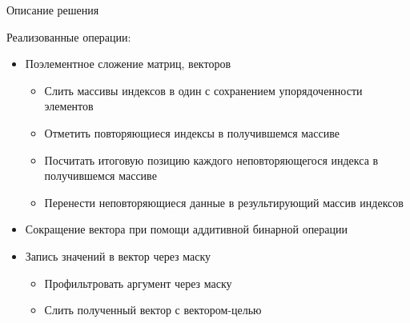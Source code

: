 \documentclass{beamer}
\begin{document}
\begin{frame}{Описание решения}

Реализованные операции:
\begin{itemize}
    \item Поэлементное сложение матриц, векторов
    \begin{itemize}
        \item Слить массивы индексов в один с сохранением упорядоченности элементов
        \item Отметить повторяющиеся индексы в получившемся массиве
        \item Посчитать итоговую позицию каждого неповторяющегося индекса в получившемся массиве
        \item Перенести неповторяющиеся данные в результирующий массив индексов
    \end{itemize}
    \item Сокращение вектора при помощи аддитивной бинарной операции
    \item Запись значений в вектор через маску
    \begin{itemize}
        \item Профильтровать аргумент через маску
        \item Слить полученный вектор с вектором-целью
    \end{itemize}
\end{itemize}
    
\end{frame}
\end{document}
